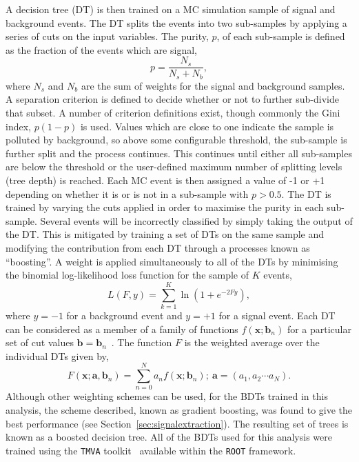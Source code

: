 A decision tree (DT) is then trained on a MC simulation sample of signal and background 
events. The DT splits the events into two sub-samples by applying a series of cuts
on the input variables. The purity, $p$, of each sub-sample is defined as 
the fraction of the events which are signal, 
\begin{equation}
p = \frac{N_{s}}{N_{s}+N_{b}},
\end{equation}
where $N_{s}$ and $N_{b}$ are the sum of weights for the signal and background samples.
A separation criterion is defined to decide whether or not to further sub-divide
that subset. A number of criterion definitions exist, though commonly the 
Gini index, $p(1-p)$ is used. Values which are close to one indicate 
the sample is polluted by background, so above some configurable threshold, 
the sub-sample is further split and the process continues. 
This continues until either all sub-samples are below the threshold or the
user-defined maximum number of splitting levels (tree depth) is reached. 
Each MC event is then assigned a value of -1 or +1 depending on whether it is
or is not in a sub-sample with $p>0.5$. The DT is trained by varying the cuts 
applied in order to maximise the purity in each sub-sample.
Several events will be incorrectly classified by simply taking the output of the DT.
This is mitigated by training a set of DTs on the same sample and modifying the 
contribution from each DT through a processes known as ``boosting''. 
A weight is applied simultaneously to all of the DTs by minimising the 
binomial log-likelihood loss function for the sample of $K$ events,
\begin{equation}
L(F,y) = \sum_{k=1}^{K} \ln\left(1+e^{-2 Fy} \right),
\end{equation}
where $y=-1$ for a background event and $y=+1$ for a signal event.
Each DT can be considered as a member of a family of functions $f(\mathbf{x};\mathbf{b}_{n})$ 
for a particular set of cut values $\mathbf{b}=\mathbf{b}_{n}$~\citep{friedmanbdt}.
The function $F$ is the weighted average over the individual DTs given by,
\begin{equation}
F(\mathbf{x};\mathbf{a},\mathbf{b}_{n}) = 
	\sum_{n=0}^{N}a_{n}f(\mathbf{x};\mathbf{b}_{n});~\mathbf{a}=(a_{1},a_{2}\cdots a_{N}).
\end{equation}
Although other weighting schemes can be used, for the BDTs trained in this analysis, 
the scheme described, known as gradient boosting, was found to give the best performance 
(see Section~\ref{sec:signalextraction}).
The resulting set of trees is known as a boosted decision tree. 
All of the BDTs used for this analysis were trained using the \texttt{TMVA} 
toolkit~\citep{tmva} available within the \texttt{ROOT} framework.
